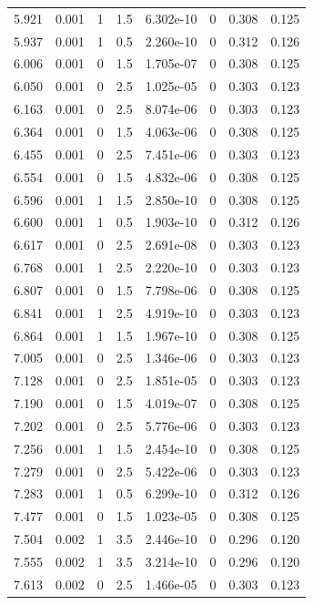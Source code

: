 \documentclass[preview]{standalone}
\begin{document}
{{{\begin{tabular}{L{1.2cm}C{1.2cm} C{0.3cm}C{0.5cm} C{1.4cm}C{1.4cm} C{1.4cm}C{1.4cm}}
  5.921  &  0.001  & 1     & 1.5 &  6.302e-10  & 0  & 0.308 &  0.125   \\ 
  5.937  &  0.001  & 1     & 0.5 &  2.260e-10  & 0  & 0.312 &  0.126   \\ 
  6.006  &  0.001  & 0     & 1.5 &  1.705e-07  & 0  & 0.308 &  0.125   \\ 
  6.050  &  0.001  & 0     & 2.5 &  1.025e-05  & 0  & 0.303 &  0.123   \\ 
  6.163  &  0.001  & 0     & 2.5 &  8.074e-06  & 0  & 0.303 &  0.123   \\ 
  6.364  &  0.001  & 0     & 1.5 &  4.063e-06  & 0  & 0.308 &  0.125   \\ 
  6.455  &  0.001  & 0     & 2.5 &  7.451e-06  & 0  & 0.303 &  0.123   \\ 
  6.554  &  0.001  & 0     & 1.5 &  4.832e-06  & 0  & 0.308 &  0.125   \\ 
  6.596  &  0.001  & 1     & 1.5 &  2.850e-10  & 0  & 0.308 &  0.125   \\ 
  6.600  &  0.001  & 1     & 0.5 &  1.903e-10  & 0  & 0.312 &  0.126   \\ 
  6.617  &  0.001  & 0     & 2.5 &  2.691e-08  & 0  & 0.303 &  0.123   \\ 
  6.768  &  0.001  & 1     & 2.5 &  2.220e-10  & 0  & 0.303 &  0.123   \\ 
  6.807  &  0.001  & 0     & 1.5 &  7.798e-06  & 0  & 0.308 &  0.125   \\ 
  6.841  &  0.001  & 1     & 2.5 &  4.919e-10  & 0  & 0.303 &  0.123   \\ 
  6.864  &  0.001  & 1     & 1.5 &  1.967e-10  & 0  & 0.308 &  0.125   \\ 
  7.005  &  0.001  & 0     & 2.5 &  1.346e-06  & 0  & 0.303 &  0.123   \\ 
  7.128  &  0.001  & 0     & 2.5 &  1.851e-05  & 0  & 0.303 &  0.123   \\ 
  7.190  &  0.001  & 0     & 1.5 &  4.019e-07  & 0  & 0.308 &  0.125   \\ 
  7.202  &  0.001  & 0     & 2.5 &  5.776e-06  & 0  & 0.303 &  0.123   \\ 
  7.256  &  0.001  & 1     & 1.5 &  2.454e-10  & 0  & 0.308 &  0.125   \\ 
  7.279  &  0.001  & 0     & 2.5 &  5.422e-06  & 0  & 0.303 &  0.123   \\ 
  7.283  &  0.001  & 1     & 0.5 &  6.299e-10  & 0  & 0.312 &  0.126   \\ 
  7.477  &  0.001  & 0     & 1.5 &  1.023e-05  & 0  & 0.308 &  0.125   \\ 
  7.504  &  0.002  & 1     & 3.5 &  2.446e-10  & 0  & 0.296 &  0.120   \\ 
  7.555  &  0.002  & 1     & 3.5 &  3.214e-10  & 0  & 0.296 &  0.120   \\ 
  7.613  &  0.002  & 0     & 2.5 &  1.466e-05  & 0  & 0.303 &  0.123   \\ 
\hline 
\end{tabular} 

}}}
\end{document}

